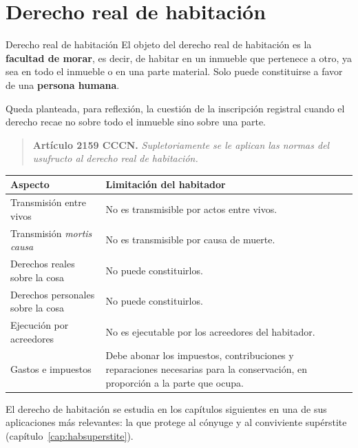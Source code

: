 \documentclass[12pt,oneside]{book}
\begin{document}
\section{Derecho real de habitación}

\begin{definicion}{Derecho real de habitación}
El objeto del derecho real de habitación es la \textbf{facultad de morar}, es decir, de habitar en un inmueble que pertenece a otro, ya sea en todo el inmueble o en una parte material. Solo puede constituirse a favor de una \textbf{persona humana}.
\end{definicion}

\begin{nota}
Queda planteada, para reflexión, la cuestión de la inscripción registral cuando el derecho recae no sobre todo el inmueble sino sobre una parte.
\end{nota}

\begin{quote}
\textbf{Artículo 2159 CCCN.} \textit{Supletoriamente se le aplican las normas del usufructo al derecho real de habitación.}
\end{quote}

\begin{table}[H]
\centering
\begin{tabularx}{\textwidth}{>{\raggedright\arraybackslash}p{}>{\raggedright\arraybackslash}X}
\toprule
\textbf{Aspecto} & \textbf{Limitación del habitador} \\
\midrule
Transmisión entre vivos & No es transmisible por actos entre vivos. \\
Transmisión \textit{mortis causa} & No es transmisible por causa de muerte. \\
Derechos reales sobre la cosa & No puede constituirlos. \\
Derechos personales sobre la cosa & No puede constituirlos. \\
Ejecución por acreedores & No es ejecutable por los acreedores del habitador. \\
Gastos e impuestos & Debe abonar los impuestos, contribuciones y reparaciones necesarias para la conservación, en proporción a la parte que ocupa. \\
\bottomrule
\end{tabularx}
\end{table}

El derecho de habitación se estudia en los capítulos siguientes en una de sus aplicaciones más relevantes: la que protege al cónyuge y al conviviente supérstite (capítulo~\ref{cap:habsuperstite}).
\end{document}

